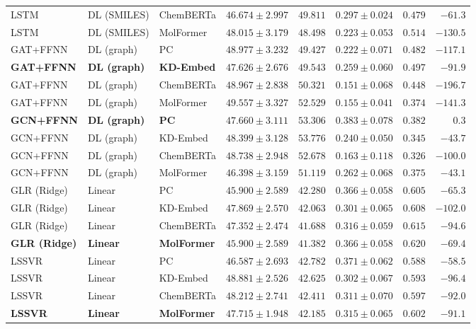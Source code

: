 \documentclass{article}
\begin{document}
\begin{table}[!ht]
{\begin{tabular}{lllccccr}
LSTM & DL (SMILES) & ChemBERTa & $46.674 \pm 2.997$ & $49.811$ & $0.297 \pm 0.024$ & $0.479$ & $-61.3$ \\
LSTM & DL (SMILES) & MolFormer & $48.015 \pm 3.179$ & $48.498$ & $0.223 \pm 0.053$ & $0.514$ & $-130.5$ \\
\midrule
GAT+FFNN & DL (graph) & PC & $48.977 \pm 3.232$ & $49.427$ & $0.222 \pm 0.071$ & $0.482$ & $-117.1$ \\
\textbf{GAT+FFNN} & \textbf{DL (graph)} & \textbf{KD-Embed} & $\mathbf{47.626 \pm 2.676}$ & $\mathbf{49.543}$ & $\mathbf{0.259 \pm 0.060}$ & $\mathbf{0.497}$ & $\mathbf{-91.9}$ \\
GAT+FFNN & DL (graph) & ChemBERTa & $48.967 \pm 2.838$ & $50.321$ & $0.151 \pm 0.068$ & $0.448$ & $-196.7$ \\
GAT+FFNN & DL (graph) & MolFormer & $49.557 \pm 3.327$ & $52.529$ & $0.155 \pm 0.041$ & $0.374$ & $-141.3$ \\
\textbf{GCN+FFNN} & \textbf{DL (graph)} & \textbf{PC} & $\mathbf{47.660 \pm 3.111}$ & $\mathbf{53.306}$ & $\mathbf{0.383 \pm 0.078}$ & $\mathbf{0.382}$ & $\mathbf{0.3}$ \\
GCN+FFNN & DL (graph) & KD-Embed & $48.399 \pm 3.128$ & $53.776$ & $0.240 \pm 0.050$ & $0.345$ & $-43.7$ \\
GCN+FFNN & DL (graph) & ChemBERTa & $48.738 \pm 2.948$ & $52.678$ & $0.163 \pm 0.118$ & $0.326$ & $-100.0$ \\
GCN+FFNN & DL (graph) & MolFormer & $46.398 \pm 3.159$ & $51.119$ & $0.262 \pm 0.068$ & $0.375$ & $-43.1$ \\
\midrule
GLR (Ridge) & Linear & PC & $45.900 \pm 2.589$ & $42.280$ & $0.366 \pm 0.058$ & $0.605$ & $-65.3$ \\
GLR (Ridge) & Linear & KD-Embed & $47.869 \pm 2.570$ & $42.063$ & $0.301 \pm 0.065$ & $0.608$ & $-102.0$ \\
GLR (Ridge) & Linear & ChemBERTa & $47.352 \pm 2.474$ & $41.688$ & $0.316 \pm 0.059$ & $0.615$ & $-94.6$ \\
\textbf{GLR (Ridge)} & \textbf{Linear} & \textbf{MolFormer} & $\mathbf{45.900 \pm 2.589}$ & $\mathbf{41.382}$ & $\mathbf{0.366 \pm 0.058}$ & $\mathbf{0.620}$ & $\mathbf{-69.4}$ \\
LSSVR & Linear & PC & $46.587 \pm 2.693$ & $42.782$ & $0.371 \pm 0.062$ & $0.588$ & $-58.5$ \\
LSSVR & Linear & KD-Embed & $48.881 \pm 2.526$ & $42.625$ & $0.302 \pm 0.067$ & $0.593$ & $-96.4$ \\
LSSVR & Linear & ChemBERTa & $48.212 \pm 2.741$ & $42.411$ & $0.311 \pm 0.070$ & $0.597$ & $-92.0$ \\
\textbf{LSSVR} & \textbf{Linear} & \textbf{MolFormer} & $\mathbf{47.715 \pm 1.948}$ & $\mathbf{42.185}$ & $\mathbf{0.315 \pm 0.065}$ & $\mathbf{0.602}$ & $\mathbf{-91.1}$ \\
\bottomrule
\end{tabular}
}
\end{table}
\end{document}
